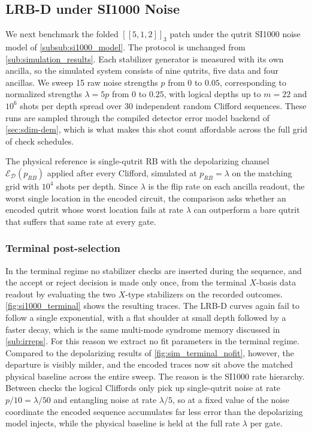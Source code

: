 \subsection{LRB-D under SI1000 Noise}
\label{sub:si1000_results}

We next benchmark the folded $[[5,1,2]]_3$ patch under the qutrit SI1000 noise model of \autoref{subsub:si1000_model}. The protocol is unchanged from \autoref{sub:simulation_results}. Each stabilizer generator is measured with its own ancilla, so the simulated system consists of nine qutrits, five data and four ancillas. We sweep 15 raw noise strengths $p$ from $0$ to $0.05$, corresponding to normalized strengths $\lambda = 5p$ from $0$ to $0.25$, with logical depths up to $m=22$ and $10^6$ shots per depth spread over 30 independent random Clifford sequences. These runs are sampled through the compiled detector error model backend of \autoref{sec:sdim-dem}, which is what makes this shot count affordable across the full grid of check schedules.

The physical reference is single-qutrit RB with the depolarizing channel $\mathcal{E}_{\mathcal{D}}(p_{RB})$ applied after every Clifford, simulated at $p_{RB} = \lambda$ on the matching grid with $10^4$ shots per depth. Since $\lambda$ is the flip rate on each ancilla readout, the worst single location in the encoded circuit, the comparison asks whether an encoded qutrit whose worst location fails at rate $\lambda$ can outperform a bare qutrit that suffers that same rate at every gate.

\subsubsection{Terminal post-selection}
In the terminal regime no stabilizer checks are inserted during the sequence, and the accept or reject decision is made only once, from the terminal $X$-basis data readout by evaluating the two $X$-type stabilizers on the recorded outcomes. \autoref{fig:si1000_terminal} shows the resulting traces. The LRB-D curves again fail to follow a single exponential, with a flat shoulder at small depth followed by a faster decay, which is the same multi-mode syndrome memory discussed in \autoref{sub:irreps}. For this reason we extract no fit parameters in the terminal regime. Compared to the depolarizing results of \autoref{fig:sim_terminal_nofit}, however, the departure is visibly milder, and the encoded traces now sit above the matched physical baseline across the entire sweep. The reason is the SI1000 rate hierarchy. Between checks the logical Cliffords only pick up single-qutrit noise at rate $p/10 = \lambda/50$ and entangling noise at rate $\lambda/5$, so at a fixed value of the noise coordinate the encoded sequence accumulates far less error than the depolarizing model injects, while the physical baseline is held at the full rate $\lambda$ per gate.

